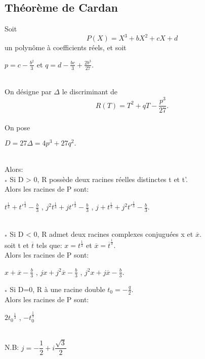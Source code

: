 \documentclass[12pt,a4paper,oneside]{book}
\begin{document}
\begin{titlepage}
\section*{Théorème de Cardan}
 Soit $$ P(X)=X^3+bX^2+cX+d $$ un polyn\^ome à coefficients réels, et soit \\ 
  \begin{center}
\( p=c-\frac{b^2}{3}\) \hspace{1,5\baselineskip} et \hspace{1,5\baselineskip} \(q=d-\frac{bc}{3}+\frac{2b^3}{27}\).
\end{center} \\
On désigne par $\Delta$ le discriminant de  
\[R(T)=T^2+qT-\frac{p^3}{27}.\]\\
On pose \begin{center}
$D=27\Delta=4p^3+27q^2.$
\end{center} \\
Alors: \\
$_*$ Si D > 0, R possède deux racines réelles distinctes t et t'.\\ Alors les racines de P sont:\\
 \begin{center}
 $t^{\frac{1}{3}}+{t'}^{\frac{1}{3}}-\frac{b}{3}$ \hspace{2\baselineskip},\hspace{2\baselineskip}  $j^2t^{\frac{1}{3}}+j {t'}^{\frac{1}{3}}-\frac{b}{3}$ \hspace{2\baselineskip},\hspace{2\baselineskip} $j+t^{\frac{1}{3}}+j^2{t'}^{\frac{1}{3}}-\frac{b}{3}.$ 
  \end{center} \\
 $_*$ Si D < 0, R admet deux racines complexes conjuguées x et $\overline{x}$.\\ soit t et $\overline{t}$ tels que: $x={t}^{\frac{1}{3}}$ et $\overline{x}={\overline{t}}^{\frac{1}{3}}$.\\
 Alors les racines de P sont:\\
 \begin{center}
 $x+\overline{x}-\frac{b}{3}$\hspace{1,5\baselineskip} ,\hspace{1,5\baselineskip} $jx+j^2 \overline{x}-\frac{b}{3}$ \hspace{1,5\baselineskip} , \hspace{1,5\baselineskip} $j^2x+j\overline{x}-\frac{b}{3}$.
 \end{center}
 $_*$ Si D=0, R à une racine double $t_0=-\frac{q}{2}$.
 \\ Alors les racines de P sont:\\
 \begin{center}
 $2{t_0}^{\frac{1}{3}}$ \hspace{1,5\baselineskip} , \hspace{1,5\baselineskip} $-t_0^{\frac{1}{3}}$
 \end{center} \\
  N.B: \hspace{2\baselineskip} $j=-\dfrac{1}{2}+i\dfrac{\sqrt{3}}{2}$
\end{titlepage}
\end{document}

